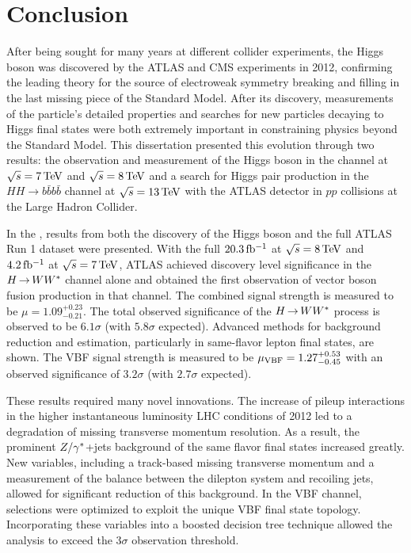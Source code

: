 \chapter{Conclusion}
\label{conclusion}

After being sought for many years at different collider experiments, the Higgs boson was discovered by the ATLAS and CMS experiments in 2012, confirming the leading theory for the source of electroweak symmetry breaking and filling in the last missing piece of the Standard Model. After its discovery, measurements of the particle's detailed properties and searches for new particles decaying to Higgs final states were both extremely important in constraining physics beyond the Standard Model. This dissertation presented this evolution through two results: the observation and measurement of the Higgs boson in the \HWWfull channel at $\sqrt{s} = 7 \TeV$ and $\sqrt{s} = 8 \TeV$ and a search for Higgs pair production in the $HH\to b\bar{b}b\bar{b}$ channel at $\sqrt{s} = 13 \TeV$ with the ATLAS detector in $pp$ collisions at the Large Hadron Collider.

In the \HWWfull, results from both the discovery of the Higgs boson and the full ATLAS Run 1 dataset were presented. With the full $20.3\mbox{\,fb$^{-1}$}$ at $\sqrt{s} =  8 \TeV$ and $4.2\mbox{\,fb$^{-1}$}$ at $\sqrt{s} = 7 \TeV$, ATLAS achieved discovery level significance in the $H{\,{\rightarrow}\,}WW^\ast$ channel alone and obtained the first observation of vector boson fusion production in that channel. The combined signal strength is measured to be $\mu = 1.09^{+0.23}_{-0.21}$. The total observed significance of the $H{\,{\rightarrow}\,}WW^\ast$ process is observed to be $6.1\sigma$ (with $5.8 \sigma$ expected). Advanced methods for background reduction and estimation, particularly in same-flavor lepton final states, are shown. The VBF signal strength is measured to be $\mu_{\rm VBF} = 1.27^{+0.53}_{-0.45}$ with an observed significance of $3.2\sigma$ (with $2.7 \sigma$ expected). 

These results required many novel innovations. The increase of pileup interactions in the higher instantaneous luminosity LHC conditions of 2012 led to a degradation of missing transverse momentum resolution. As a result, the prominent $Z/\gamma^{\ast}$+jets background of the same flavor \HWWfull final states increased greatly. New variables, including a track-based missing transverse momentum and a measurement of the balance between the dilepton system and recoiling jets, allowed for significant reduction of this background. In the VBF channel, selections were optimized to exploit the unique VBF final state topology. Incorporating these variables into a boosted decision tree technique allowed the analysis to exceed the $3\sigma$ observation threshold.

